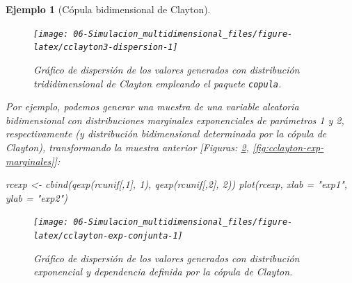 \documentclass[
]{book}
\newenvironment{Shaded}{\begin{snugshade}}{\end{snugshade}}
\newcommand{\AttributeTok}[1]{\textcolor[rgb]{0.77,0.63,0.00}{#1}}
\newcommand{\DecValTok}[1]{\textcolor[rgb]{0.00,0.00,0.81}{#1}}
\newcommand{\FunctionTok}[1]{\textcolor[rgb]{0.00,0.00,0.00}{#1}}
\newcommand{\NormalTok}[1]{#1}
\newcommand{\OtherTok}[1]{\textcolor[rgb]{0.56,0.35,0.01}{#1}}
\newcommand{\StringTok}[1]{\textcolor[rgb]{0.31,0.60,0.02}{#1}}
\theoremstyle{break}
\newtheorem{example}{Ejemplo}[chapter]
\theoremstyle{nonumberplain}
\begin{document}
\begin{example}[Cópula bidimensional de Clayton]
\begin{figure}[!htb]

{\centering \texttt{[image: 06-Simulacion\_multidimensional\_files/figure-latex/cclayton3-dispersion-1]} 

}

\caption{Gráfico de dispersión de los valores generados con distribución trididimensional de Clayton empleando el paquete \texttt{copula}.}\label{fig:cclayton3-dispersion}
\end{figure}

Por ejemplo, podemos generar una muestra de una variable aleatoria bidimensional con distribuciones marginales exponenciales de parámetros 1 y 2, respectivamente (y distribución bidimensional determinada por la cópula de Clayton), transformando la muestra anterior {[}Figuras: \ref{fig:cclayton-exp-conjunta}, \ref{fig:cclayton-exp-marginales}{]}:

\begin{Shaded}
\begin{Highlighting}[]
\NormalTok{rcexp }\OtherTok{\textless{}{-}} \FunctionTok{cbind}\NormalTok{(}\FunctionTok{qexp}\NormalTok{(rcunif[,}\DecValTok{1}\NormalTok{], }\DecValTok{1}\NormalTok{), }\FunctionTok{qexp}\NormalTok{(rcunif[,}\DecValTok{2}\NormalTok{], }\DecValTok{2}\NormalTok{))}
\FunctionTok{plot}\NormalTok{(rcexp, }\AttributeTok{xlab =} \StringTok{"exp1"}\NormalTok{, }\AttributeTok{ylab =} \StringTok{"exp2"}\NormalTok{)  }
\end{Highlighting}
\end{Shaded}

\begin{figure}[!htb]

{\centering \texttt{[image: 06-Simulacion\_multidimensional\_files/figure-latex/cclayton-exp-conjunta-1]} 

}

\caption{Gráfico de dispersión de los valores generados con distribución exponencial y dependencia definida por la cópula de Clayton.}\label{fig:cclayton-exp-conjunta}
\end{figure}


\end{example}
\end{document}
